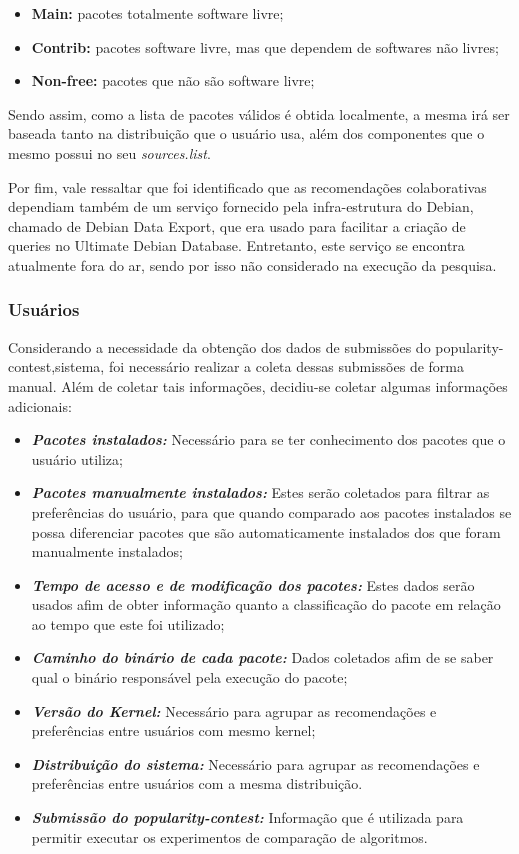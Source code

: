 \begin{itemize}
    \item \textbf{Main:} pacotes totalmente software livre;
    \item \textbf{Contrib:} pacotes software livre, mas que dependem de
        softwares não livres;
    \item \textbf{Non-free:} pacotes que não são software livre;
\end{itemize}

Sendo assim, como a lista de pacotes válidos é obtida localmente, a mesma irá ser baseada tanto na
distribuição que o usuário usa, além dos componentes que o mesmo possui no seu
\textit{sources.list}.

Por fim, vale ressaltar que foi identificado que as recomendações
colaborativas dependiam também de um serviço fornecido pela infra-estrutura do
Debian, chamado de Debian Data Export, que era usado para facilitar a criação de
queries no Ultimate Debian Database. Entretanto, este serviço se encontra
atualmente fora do ar, sendo por isso não considerado na execução da pesquisa.

\subsubsection{Usuários} \label{sec:coleta_dados_usuario}

Considerando a necessidade da obtenção dos dados de submissões do
popularity-contest,sistema, foi necessário realizar a coleta dessas submissões
de forma manual. Além de coletar tais informações, decidiu-se coletar algumas
informações adicionais:

\begin{itemize}
    \item \textit{\textbf{Pacotes instalados:}} Necessário para se ter conhecimento dos pacotes que o usuário utiliza;
    \item \textit{\textbf{Pacotes manualmente instalados:}} Estes serão coletados para filtrar as preferências do usuário, para que quando comparado aos pacotes instalados se possa diferenciar pacotes que são automaticamente instalados dos que foram manualmente instalados;
    \item \textit{\textbf{Tempo de acesso e de modificação dos pacotes:}} Estes dados serão usados afim de obter informação quanto a classificação do pacote em relação ao tempo que este foi utilizado;
    \item \textit{\textbf{Caminho do binário de cada pacote:}} Dados coletados afim de se saber qual o binário responsável pela execução do pacote;
    \item \textit{\textbf{Versão do Kernel:}} Necessário para agrupar as recomendações e preferências entre usuários com mesmo kernel;
    \item \textit{\textbf{Distribuição do sistema:}} Necessário para agrupar as recomendações e preferências entre usuários com a mesma distribuição.
    \item \textit{\textbf{Submissão do popularity-contest:}} Informação que é
        utilizada para permitir executar os experimentos de comparação de
        algoritmos.
\end{itemize}

